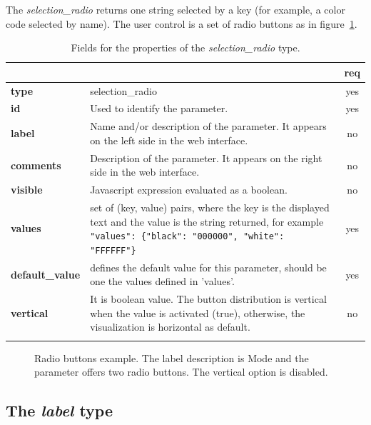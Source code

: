 The \emph{selection\_radio} returns one string selected by a key (for example, a color code selected by name). The user control is a set of radio buttons as in figure~\ref{fig:selection_radio_example}.

\begin{longtable}{|>{\bf}L{\linewidth}|L{\linewidth}|c|}
\hline
      &  & {\bf req} 
\tabularnewline \hline \hline
 type     & selection\_radio    & yes \\ \hline
 id     & Used to identify the parameter. & yes \\ \hline
 label  & Name and/or description of the parameter. It appears on the left side in the web interface. & no
                      \\ \hline
 comments & Description of the parameter. It appears on the right side in the web interface. & no
                      \\ \hline
 visible    & Javascript expression evaluated as a boolean.
            & no \\ \hline
 values   & set of (key, value) pairs, where the key is the displayed text and the 
value is the string returned, for example \texttt{"values": \{"black": "000000", "white": "FFFFFF"\}} & yes
                      \\ \hline
 default\_value & defines the default value for this parameter, should be one 
the values defined in 'values'. & yes \\ \hline
 vertical & It is boolean value. The button distribution is vertical when the value is activated (true), otherwise, the visualization is horizontal as default. & no \\ \hline
\caption{Fields for the properties of the \emph{selection\_radio} type.}
\end{longtable}

\begin{figure}[h]
\centering
{}
\caption{Radio buttons example. The label description is Mode and the parameter offers two radio buttons. The vertical option is disabled.}
\label{fig:selection_radio_example}
\end{figure}

\subsection{The \emph{label} type}

